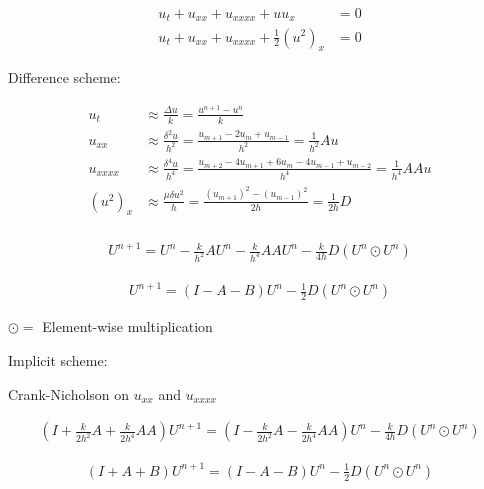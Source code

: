 
\begin{align*}
u_t + u_{xx} + u_{xxxx} + uu_x &= 0 \\
u_t + u_{xx} + u_{xxxx} + \frac{1}{2}(u^2)_x &= 0
\end{align*}

Difference scheme:

\LARGE
\begin{align*}
u_t &\approx \frac{\Delta u}{k} = \frac{u^{n+1}-u^n}{k} \\
u_{xx} &\approx \frac{\delta^2 u}{h^2} = \frac{u_{m+1}-2u_{m}+u_{m-1}}{h^2} = \frac{1}{h^2}Au \\
u_{xxxx} &\approx \frac{\delta^4 u}{h^4} = \frac{u_{m+2}-4u_{m+1}+6u_m-4u_{m-1}+u_{m-2}}{h^4} = \frac{1}{h^4}AAu\\
(u^2)_{x} &\approx \frac{\mu \delta u^2}{h} = \frac{(u_{m+1})^2-(u_{m-1})^2}{2h} = \frac{1}{2h}D\\
\end{align*}

\begin{align*}
U^{n+1} = U^n - \frac{k}{h^2}AU^n - \frac{k}{h^4}AAU^n - \frac{k}{4h}D(U^{n}\odot U^n)
\end{align*}

\begin{align*}
U^{n+1} = (I - A - B)U^n - \frac{1}{2} D(U^{n}\odot U^n)
\end{align*}

$\odot =$ Element-wise multiplication

\Huge
Implicit scheme: 

\Large
Crank-Nicholson on $u_{xx}$ and $u_{xxxx}$

\begin{align*}
(I + \frac{k}{2h^2}A + \frac{k}{2h^4}AA)U^{n+1} = (I - \frac{k}{2h^2}A - \frac{k}{2h^4}AA)U^n - \frac{k}{4h}D(U^{n}\odot U^n)
\end{align*}


\begin{align*}
(I + A + B)U^{n+1} = (I - A - B)U^n - \frac{1}{2}D(U^{n}\odot U^n)
\end{align*}